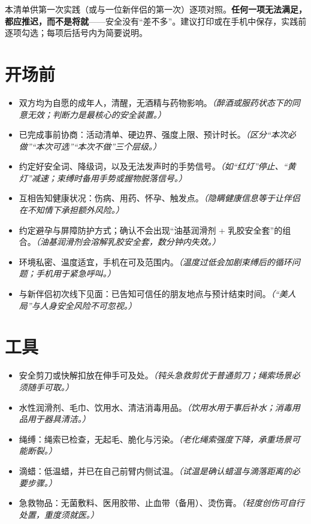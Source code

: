\documentclass[12pt,UTF8]{ctexbook}
\begin{document}
本清单供第一次实践（或与一位新伴侣的第一次）逐项对照。\textbf{任何一项无法满足，都应推迟，而不是将就}——安全没有“差不多”。建议打印或在手机中保存，实践前逐项勾选；每项后括号内为简要说明。

\section{开场前}

\begin{itemize}
\item[$\square$] 双方均为自愿的成年人，清醒，无酒精与药物影响。\textit{（醉酒或服药状态下的同意无效；判断力是最核心的安全装置。）}
\item[$\square$] 已完成事前协商：活动清单、硬边界、强度上限、预计时长。\textit{（区分“本次必做”“本次可选”“本次不做”三个层级。）}
\item[$\square$] 约定好安全词、降级词，以及无法发声时的手势信号。\textit{（如“红灯”停止、“黄灯”减速；束缚时备用手势或握物脱落信号。）}
\item[$\square$] 互相告知健康状况：伤病、用药、怀孕、触发点。\textit{（隐瞒健康信息等于让伴侣在不知情下承担额外风险。）}
\item[$\square$] 约定避孕与屏障防护方式；确认不会出现“油基润滑剂 + 乳胶安全套”的组合。\textit{（油基润滑剂会溶解乳胶安全套，数分钟内失效。）}
\item[$\square$] 环境私密、温度适宜，手机在可及范围内。\textit{（温度过低会加剧束缚后的循环问题；手机用于紧急呼叫。）}
\item[$\square$] 与新伴侣初次线下见面：已告知可信任的朋友地点与预计结束时间。\textit{（“美人局”与人身安全风险不可忽视。）}
\end{itemize}

\section{工具}

\begin{itemize}
\item[$\square$] 安全剪刀或快解扣放在伸手可及处。\textit{（钝头急救剪优于普通剪刀；绳索场景必须随手可取。）}
\item[$\square$] 水性润滑剂、毛巾、饮用水、清洁消毒用品。\textit{（饮用水用于事后补水；消毒用品用于器具清洁。）}
\item[$\square$] 绳缚：绳索已检查，无起毛、脆化与污染。\textit{（老化绳索强度下降，承重场景可能断裂。）}
\item[$\square$] 滴蜡：低温蜡，并已在自己前臂内侧试温。\textit{（试温是确认蜡温与滴落距离的必要步骤。）}
\item[$\square$] 急救物品：无菌敷料、医用胶带、止血带（备用）、烫伤膏。\textit{（轻度创伤可自行处置，重度须就医。）}
\end{itemize}
\end{document}
